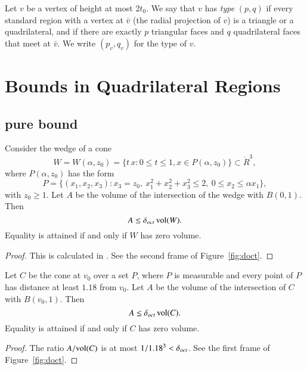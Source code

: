 Let $v$ be a vertex of height at most $2t_0$.  We say that $v$ has
{\it type\/} $(p,q)$ if every standard region with a vertex at $\bar
v$ (the radial projection of $v$) is a triangle or a quadrilateral,
and if there are exactly $p$ triangular faces and $q$ quadrilateral
faces that meet at $\bar v$.  We write $(p_v,q_v)$ for the type of
$v$.









\section{Bounds in Quadrilateral Regions}%
    \label{sec:bounds}



\subsection{pure bound}%



\begin{lemma} \label{lemma:wedge} Consider the wedge of a cone
    $$
    W =W(\alpha,z_0) =
    \{ t\, x : 0\le t \le 1, x\in P(\alpha,z_0)\}\subset\ring{R}^3,
    $$
where $P(\alpha,z_0)$ has the form
    $$
    P = \{(x_1,x_2,x_3) :
    x_3 = z_0,\   x_1^2+x_2^2+x_3^2\le 2,\ 0\le x_2\le \alpha x_1\},
    $$
with $z_0\ge1$.  Let $A$ be the volume of the intersection of the
wedge with $B(0,1)$. Then
    $$A\le\delta_{oct}\,{\operatorname{vol}}(W).$$
Equality is attained if and only if $W$ has zero volume.
\end{lemma}

\begin{proof} This is calculated in \cite[Sec. 4]{part2}.  See the
second frame of Figure~\ref{fig:doct}.
\end{proof}

\begin{lemma} \label{lemma:cone}
Let $C$ be the cone at $v_0$ over a set $P$, where $P$ is
measurable and every point of $P$ has distance at least $1.18$
from $v_0$.  Let $A$ be the volume of the intersection of $C$
with $B(v_0,1)$. Then
    $$A\le\delta_{oct}\,{\operatorname{vol}}(C).$$
Equality is attained if and only if $C$ has zero volume.
\end{lemma}

\begin{proof} The ratio $A/{\operatorname{vol}}(C)$ is at most $1/1.18^3 < \delta_{oct}$.   See the
first frame of Figure~\ref{fig:doct}.
\end{proof}

